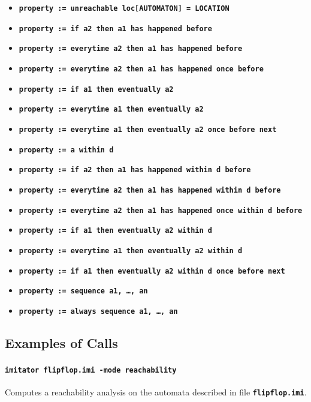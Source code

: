 \documentclass[a4paper,11pt]{report}
\newcommand{\imitatorExec}{\code{imitator}}
\newcommand{\code}[1]{\textbf{\texttt{#1}}}
\begin{document}
\begin{itemize}
	\item \code{property := unreachable loc[AUTOMATON] = LOCATION}
	\item \code{property := if a2 then a1 has happened before}
	\item \code{property := everytime a2 then a1 has happened before}
	\item \code{property := everytime a2 then a1 has happened once before}
	\item \code{property := if a1 then eventually a2}
	\item \code{property := everytime a1 then eventually a2}
	\item \code{property := everytime a1 then eventually a2 once before next}
	\item \code{property := a within d}
	\item \code{property := if a2 then a1 has happened within d before}
	\item \code{property := everytime a2 then a1 has happened within d before}
	\item \code{property := everytime a2 then a1 has happened once within d before}
	\item \code{property := if a1 then eventually a2 within d}
	\item \code{property := everytime a1 then eventually a2 within~d}
	\item \code{property := if a1 then eventually a2 within d once before next}
	\item \code{property := sequence a1, \dots, an}
	\item \code{property := always sequence a1, \dots, an}
\end{itemize}






\subsection{Examples of Calls}

\paragraph{\code{\imitatorExec{} flipflop.imi -mode reachability}}
Computes a reachability analysis on the automata described in file \code{flipflop.imi}.
\end{document}
